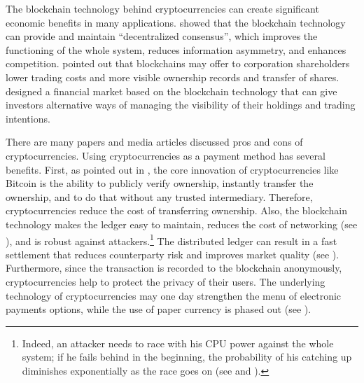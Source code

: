 \documentclass[11pt]{article}%
\numberwithin{equation}{section}
\theoremstyle{plain}
\begin{document}
The blockchain technology behind cryptocurrencies can create significant economic benefits in many applications.  \cite{cong_blockchain_nodate} showed that the blockchain technology can provide and maintain ``decentralized consensus'', which improves the functioning of the whole system, reduces information asymmetry, and enhances competition. \cite{yermack_corporate_2017} pointed out that blockchains may offer to corporation shareholders lower trading costs and more visible ownership records and transfer of shares. \cite{malinova_market_2017} designed a financial market based on the blockchain technology that can give investors alternative ways of managing the visibility of their holdings and trading intentions.



There are many papers and media articles discussed pros and cons of cryptocurrencies.
Using cryptocurrencies as a payment method has several benefits. First, as pointed out in \cite{harvey_cryptofinance_2016}, the core innovation of cryptocurrencies like Bitcoin is the ability to publicly verify ownership, instantly transfer the ownership, and to do that without any trusted intermediary. Therefore, cryptocurrencies reduce the cost of transferring ownership. Also, the blockchain technology makes the ledger easy to maintain, reduces the cost of networking (see \cite{catalini_simple_2016}), and is robust against attackers.\footnote{Indeed, an attacker needs to race with his CPU power against the whole system; if he fails behind in the beginning, the probability of his catching up diminishes exponentially as the race goes on (see \cite{nakamoto_bitcoin:_2008} and  \cite{Grunspan_2018}).} The distributed ledger can result in a fast settlement that reduces counterparty risk and improves market quality (see \cite{khapko_smart_2018}). Furthermore, since the transaction is recorded to the blockchain anonymously, cryptocurrencies help to protect the privacy of their users. The underlying technology of cryptocurrencies may one day strengthen the menu of electronic payments options, while the use of paper currency is phased out (see \cite{rogoff_costs_2015}).
\end{document}
